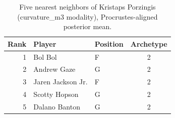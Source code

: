 \begin{table}[htbp]
  \centering\small
  \begin{tabular}{rllc}
    \toprule
    Rank & Player & Position & Archetype \\
    \midrule
    1 & Bol Bol & F & 2 \\
    2 & Andrew Gaze & G & 2 \\
    3 & Jaren Jackson Jr. & F & 2 \\
    4 & Scotty Hopson & G & 2 \\
    5 & Dalano Banton & G & 2 \\
    \bottomrule
  \end{tabular}
  \caption{Five nearest neighbors of Kristaps Porzingis (curvature_m3 modality), Procrustes-aligned posterior mean.}
  \label{tab:Kristaps_Porzingis_neighbors_curvature_m3}
\end{table}

